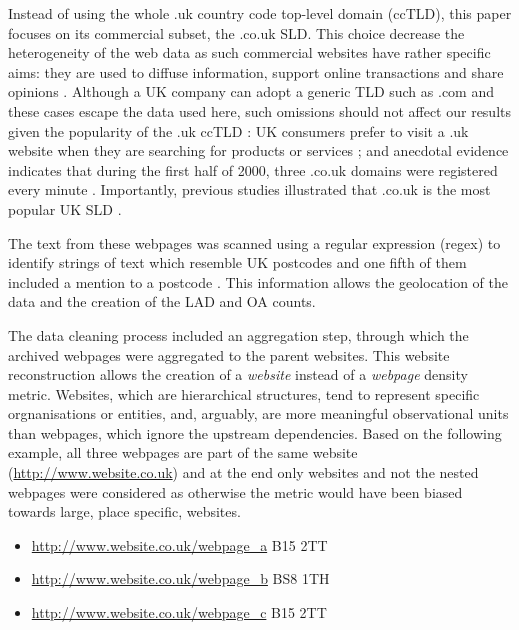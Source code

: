 \documentclass[
  authoryear,
  preprint,
  3p]{elsarticle}
\begin{document}
Instead of using the whole .uk country code top-level domain (ccTLD),
this paper focuses on its commercial subset, the .co.uk SLD. This choice
decrease the heterogeneity of the web data as such commercial websites
have rather specific aims: they are used to diffuse information, support
online transactions and share opinions
\citep{THELWALL2000441, blazquez2018big}. Although a UK company can
adopt a generic TLD such as .com and these cases escape the data used
here, such omissions should not affect our results given the popularity
of the .uk ccTLD \citep{tranosuk}: UK consumers prefer to visit a .uk
website when they are searching for products or services \citep{hope};
and anecdotal evidence indicates that during the first half of 2000,
three .co.uk domains were registered every minute \citep{oecd_coms}.
Importantly, previous studies illustrated that .co.uk is the most
popular UK SLD \citep{tranosuk}.

The text from these webpages was scanned using a regular expression
(regex) to identify strings of text which resemble UK postcodes and one
fifth of them included a mention to a postcode \citep{BL2013geo}. This
information allows the geolocation of the data and the creation of the
LAD and OA counts.

The data cleaning process included an aggregation step, through which
the archived webpages were aggregated to the parent websites. This
website reconstruction allows the creation of a \emph{website} instead
of a \emph{webpage} density metric. Websites, which are hierarchical
structures, tend to represent specific orgnanisations or entities, and,
arguably, are more meaningful observational units than webpages, which
ignore the upstream dependencies. Based on the following example, all
three webpages are part of the same website
(\url{http://www.website.co.uk}) and at the end only websites and not
the nested webpages were considered as otherwise the metric would have
been biased towards large, place specific, websites.

\begin{itemize}
\item
  \url{http://www.website.co.uk/webpage_a} B15 2TT
\item
  \url{http://www.website.co.uk/webpage_b} BS8 1TH
\item
  \url{http://www.website.co.uk/webpage_c} B15 2TT
\end{itemize}
\end{document}
